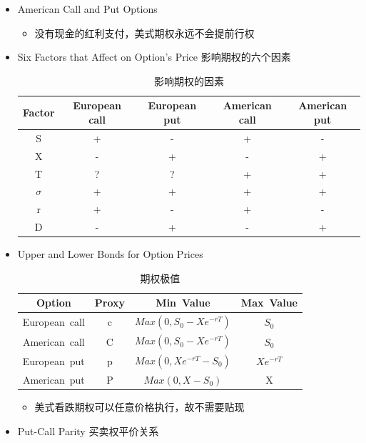\documentclass[a4paper,6pt,twoside,openany]{article}
\begin{document}
\begin{itemize}
\item American Call and Put Options
  \begin{itemize}
  \item 没有现金的红利支付，美式期权永远不会提前行权
  \end{itemize}
\item Six Factors that Affect on Option’s Price 影响期权的六个因素
  \begin{table}[!htbp]
    \renewcommand\arraystretch{1.5}
    \caption{影响期权的因素}
    \centering
    \begin{tabular}{|c|c|c|c|c|} \hline
      \rowcolor[gray]{0.5}
Factor & European call & European put & American call & American put \\ \hline
      S & + & - & + & - \\ \hline
      X & - & + & - & + \\ \hline
      T & ? & ? & + & + \\ \hline
      $\sigma$ & + & + & + & + \\ \hline
      r & + & - & + & - \\ \hline
      D & - & + & - & + \\ \hline
    \end{tabular}
  \end{table}
\item Upper and Lower Bonds for Option Prices
\begin{table}[!htbp]
  \renewcommand\arraystretch{1.5}
  \caption{期权极值}
  \centering
  \begin{tabular}{|c|c|c|c|} \hline
    \rowcolor[gray]{0.5}
    Option & Proxy & Min\ Value & Max\ Value  \\ \hline
    European\ call & c & $Max(0, S_0 - Xe^{-rT})$ & $S_0$ \\ \hline
    American\ call & C & $Max(0, S_0 - Xe^{-rT})$ & $S_0$ \\ \hline
    European\ put & p & $Max(0, Xe^{-rT}- S_0)$ & $Xe^{-rT}$ \\ \hline
    American\ put & P & $Max(0, X - S_0)$ & X \\ \hline
  \end{tabular}
\end{table}
\begin{itemize}
  \item 美式看跌期权可以任意价格执行，故不需要贴现
  \end{itemize}
\item Put-Call Parity 买卖权平价关系 
  \begin{itemize}

\end{itemize}
\end{itemize}
\end{document}
